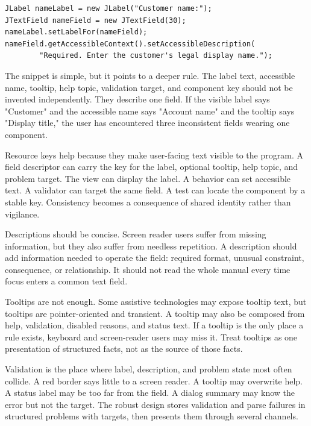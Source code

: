 \begin{lstlisting}[caption={Basic accessible labeling for a form field.}]
JLabel nameLabel = new JLabel("Customer name:");
JTextField nameField = new JTextField(30);
nameLabel.setLabelFor(nameField);
nameField.getAccessibleContext().setAccessibleDescription(
        "Required. Enter the customer's legal display name.");
\end{lstlisting}

The snippet is simple, but it points to a deeper rule. The label text, accessible name, tooltip, help topic, validation target, and component key should not be invented independently. They describe one field. If the visible label says "Customer" and the accessible name says "Account name" and the tooltip says "Display title," the user has encountered three inconsistent fields wearing one component.

Resource keys help because they make user-facing text visible to the program. A field descriptor can carry the key for the label, optional tooltip, help topic, and problem target. The view can display the label. A behavior can set accessible text. A validator can target the same field. A test can locate the component by a stable key. Consistency becomes a consequence of shared identity rather than vigilance.

Descriptions should be concise. Screen reader users suffer from missing information, but they also suffer from needless repetition. A description should add information needed to operate the field: required format, unusual constraint, consequence, or relationship. It should not read the whole manual every time focus enters a common text field.

Tooltips are not enough. Some assistive technologies may expose tooltip text, but tooltips are pointer-oriented and transient. A tooltip may also be composed from help, validation, disabled reasons, and status text. If a tooltip is the only place a rule exists, keyboard and screen-reader users may miss it. Treat tooltips as one presentation of structured facts, not as the source of those facts.

Validation is the place where label, description, and problem state most often collide. A red border says little to a screen reader. A tooltip may overwrite help. A status label may be too far from the field. A dialog summary may know the error but not the target. The robust design stores validation and parse failures in structured problems with targets, then presents them through several channels.

